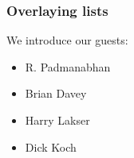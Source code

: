 \documentclass{beamer}
\begin{document}
\begin{frame}
\frametitle{Overlaying lists}

We introduce our guests:
\begin{itemize}[<+->]
\item R. Padmanabhan
\item Brian Davey
\item Harry Lakser
\item Dick Koch
\end{itemize}
\end{frame}
\end{document}
